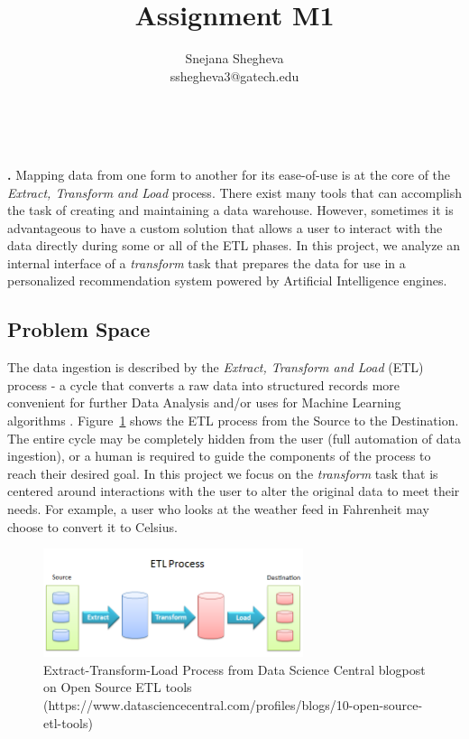 \documentclass[12pt,letterpaper]{article}
\makeatletter
\renewcommand{\maketitle}{\bgroup
   \begin{center}
   \textbf{{\fontsize{18pt}{20}\selectfont \@title}}\\
   \vspace{10pt}
   {\fontsize{12pt}{0}\selectfont \@author} 
   \end{center}
}
\newenvironment{myquote}[1]%
  {\list{}{\leftmargin=#1\rightmargin=#1}\item[]}%
  {\endlist}
\renewenvironment{abstract}
{\vspace*{-.5in}\fontsize{12pt}{12}\begin{myquote}{.5in}
\noindent \par{\bfseries \abstractname.}}
{\medskip\noindent
\end{myquote}
}
\makeatother
\begin{document}
\title{Assignment M1}
\author{Snejana Shegheva \\ sshegheva3@gatech.edu}

\maketitle
\thispagestyle{fancy}

\begin{abstract}
Mapping data from one form to another for its ease-of-use is at the core of the \textit{Extract, Transform and Load} process. There exist many tools that can accomplish the task of creating and maintaining a data warehouse. However, sometimes it is advantageous to have a custom solution that allows a user to interact with the data directly during some or all of the ETL phases. In this project, we analyze an internal interface of a \textit{transform} task that prepares the data for use in a personalized recommendation system powered by Artificial Intelligence engines. 
\end{abstract}

\subsection*{Problem Space}
The data ingestion is described by the \textit{Extract, Transform and Load} (ETL) process - a cycle that converts a raw data into structured records more convenient for further Data Analysis and/or uses for Machine Learning algorithms \cite{wiki:etl}. Figure~\ref{fig::1} shows the ETL process from the Source to the Destination. The entire cycle may be completely hidden from the user (full automation of data ingestion), or a human is required to guide the components of the process to reach their desired goal. In this project we focus on the \textit{transform} task that is centered around interactions with the user to alter the original data to meet their needs. For example, a user who looks at the weather feed in Fahrenheit may choose to convert it to Celsius. 

\begin{figure}[H]
\centering
\includegraphics[width=3in, scale=.3]{ETLProcess.png}
\caption{Extract-Transform-Load Process from Data Science Central blogpost on Open Source ETL tools (https://www.datasciencecentral.com/profiles/blogs/10-open-source-etl-tools)}
\label{fig::1}
\end{figure}
\end{document}
